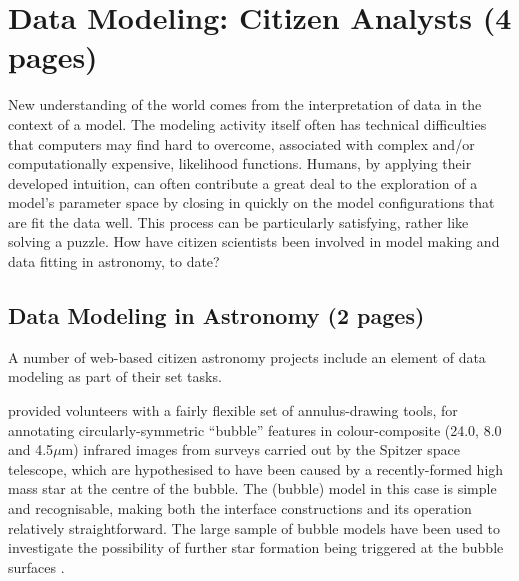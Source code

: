 \documentclass{ar2e}
\begin{document}

\section{Data Modeling: Citizen Analysts (4 pages)}
\label{sec:model}

New understanding of the world comes from the interpretation of data in the
context of a model. The modeling activity itself often has technical
difficulties that computers may find hard to overcome, associated with complex
and/or computationally expensive, likelihood functions. Humans, by applying
their developed intuition, can often contribute a great deal to the
exploration of a model's parameter space by closing in quickly on the model
configurations that are fit the data well. This process can be particularly
satisfying, rather like solving a puzzle. How have citizen scientists been
involved in model making and data fitting in astronomy, to date?



\subsection{Data Modeling in Astronomy (2 pages)}
\label{sec:model:astro}

A number of  web-based citizen astronomy projects include an element of data
modeling as part of their set tasks. 


\citet{SimpsonEtal2012} provided volunteers with a fairly flexible set of
annulus-drawing tools, for annotating circularly-symmetric ``bubble'' features
in colour-composite (24.0, 8.0 and  4.5$\mu$m) infrared images from surveys
carried out by the Spitzer space telescope, which are hypothesised to have
been caused by a recently-formed high mass star at the centre of the bubble.
The (bubble) model in this case is simple and recognisable, making both the
interface constructions and its operation relatively straightforward. The
large sample of  bubble models have been used to investigate the possibility
of further star formation being triggered at the bubble surfaces
\citep{KendrewEtal2012}.

\end{document}
